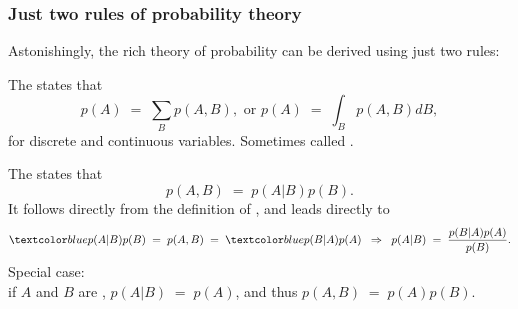 \begin{frame}
\frametitle{Just two rules of probability theory}

Astonishingly, the rich theory of probability can be derived using just two rules:

The  states that
\[
p(A)\;=\;\sum_B p(A,B), \text{\ \ \ \ or\ \ \ \ } 
p(A)\;=\;\int_B p(A,B)dB,
\]
for discrete and continuous variables. Sometimes called .

The  states that
\[
p(A,B)\;=\;p(A|B) p(B).
\]
It follows directly from the definition of , and leads directly to 
\[
\Blue{p(A|B)p(B)}\;=\;p(A,B)\;=\;\Blue{p(B|A)p(A)}\;\;\Rightarrow\;\;
p(A|B)\;=\;\frac{p(B|A)p(A)}{p(B)}.
\]
Special case:\\[0.2ex] if $A$ and $B$ are ,
$p(A|B)\;=\;p(A)$, and thus $p(A,B)\;=\;p(A)p(B)$.
\end{frame}



